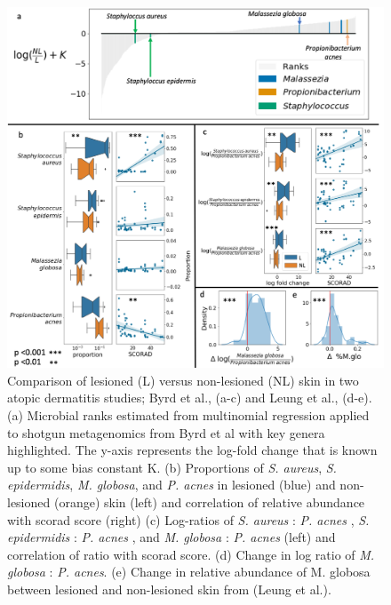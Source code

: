 \begin{figure}
  \includegraphics[width=1\textwidth]{ch4/Figure3.png}
  \caption[Comparison of lesioned versus non-lesioned skin in two atopic dermatitis studies.]{
    Comparison of lesioned (L) versus non-lesioned (NL) skin in two atopic dermatitis studies;
    Byrd et al.\cite{Byrd2017-eb}, (a-c) and Leung et al.\cite{Leung-DYM}, (d-e). (a) Microbial ranks estimated from
    multinomial regression applied to shotgun metagenomics from Byrd et al\cite{Byrd2017-eb} with key
    genera highlighted. The y-axis represents the log-fold change that is known up to some bias constant K.
    (b) Proportions of \textit{S. aureus}, \textit{S. epidermidis}, \textit{M. globosa}, and \textit{P. acnes}
    in lesioned (blue) and non-lesioned (orange) skin (left) and correlation of relative abundance
    with \gls{scorad} score (right) (c) Log-ratios of \textit{S. aureus} : \textit{P. acnes} , \textit{S. epidermidis} : \textit{P. acnes} ,
    and \textit{M. globosa} : \textit{P. acnes} (left) and correlation of ratio with \gls{scorad} score.
    (d) Change in log ratio of \textit{M. globosa} : \textit{P. acnes}. (e) Change in
    relative abundance of M. globosa between lesioned and non-lesioned skin from (Leung et al.\cite{Leung-DYM}).}
\end{figure}

